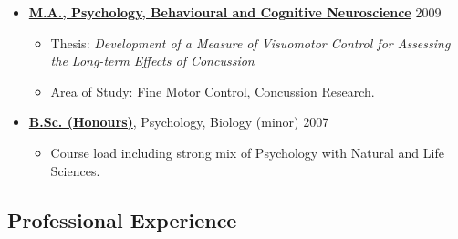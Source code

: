 \documentclass[10pt]{article}
\providecommand{\tightlist}{%
  \setlength{\itemsep}{0pt}\setlength{\parskip}{0pt}}
\begin{document}
\pagebreak[2]

\begin{itemize}
\item
  \href{http://psychology.uwaterloo.ca}{\textbf{M.A., Psychology,
  Behavioural and Cognitive Neuroscience}} \hfill 2009

  \begin{itemize}
  \tightlist
  \item
    Thesis: \emph{Development of a Measure of Visuomotor Control for
    Assessing the Long-term Effects of Concussion}
  \item
    Area of Study: Fine Motor Control, Concussion Research.
  \end{itemize}
\end{itemize}

\pagebreak[2]

\begin{itemize}
\item
  \href{http://science.uwaterloo.ca}{\textbf{B.Sc. (Honours)}},
  Psychology, Biology (minor) \hfill 2007

  \begin{itemize}
  \tightlist
  \item
    Course load including strong mix of Psychology with Natural and Life
    Sciences.
  \end{itemize}
\end{itemize}

\pagebreak[3]

\subsection{Professional Experience}\label{professional-experience}
\end{document}

